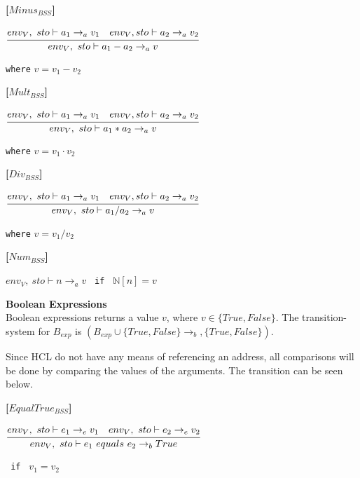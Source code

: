 \textbf{[$Minus_{BSS}$]}\\
\begin{center}
	\begin{math}
	\cfrac
		{env_V,\ sto \vdash a_1 \rightarrow_a v_1 \quad env_V, sto \vdash a_2 \rightarrow_a v_2}
		{env_V,\ sto \vdash a_1 - a_2 \rightarrow_a v}
	\end{math}
	
	
	\texttt{where} $v = v_1 - v_2$
\end{center}

\textbf{[$Mult_{BSS}$]}\\
\begin{center}
	\begin{math}
	\cfrac
	{env_V,\ sto \vdash a_1 \rightarrow_a v_1 \quad env_V, sto \vdash a_2 \rightarrow_a v_2}
	{env_V,\ sto \vdash a_1 * a_2 \rightarrow_a v}
	\end{math}
	
	
	\texttt{where} $v = v_1 \cdot v_2$
\end{center}

\textbf{[$Div_{BSS}$]}\\
\begin{center}
	\begin{math}
	\cfrac
	{env_V,\ sto \vdash a_1 \rightarrow_a v_1 \quad env_V, sto \vdash a_2 \rightarrow_a v_2}
	{env_V,\ sto \vdash a_1 / a_2 \rightarrow_a v}
	\end{math}
	
	
	\texttt{where} $v = v_1 / v_2$
\end{center}

\textbf{[$Num_{BSS}$]}\\
\begin{center}
	\begin{math}
		env_V,\ sto \vdash n \rightarrow_a v
	\end{math}
	\texttt{ if } $\mathbb{N}[n] = v$
\end{center}

\textbf{\large{Boolean Expressions}}\\
Boolean expressions returns a value $v$, where $v \in \{True, False\}$.
The transition-system for $B_{exp}$ is $(B_{exp} \cup \{True, False\} \rightarrow_b, \{True, False\})$.

Since HCL do not have any means of referencing an address, all comparisons will be done by comparing the values of the arguments.
The transition can be seen below.

\textbf{[$EqualTrue_{BSS}$]}\\
\begin{center}
	\begin{math}
	\cfrac
	{env_V,\ sto \vdash e_1 \rightarrow_e v_1 \quad env_V,\ sto \vdash e_2 \rightarrow_e v_2}
	{env_V,\ sto \vdash e_1\ equals\ e_2 \rightarrow_b True}
	\end{math}
	
	\texttt{ if } $v_1 = v_2$
\end{center}

